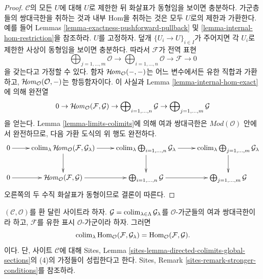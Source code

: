 \begin{proof}
$\mathcal{C}$의 모든 $U$에 대해 $U$로 제한한 뒤 화살표가 동형임을 보이면
충분하다. 가군층들의 쌍대극한을 취하는 것과 내부 Hom을 취하는 것은 모두
$U$로의 제한과 가환한다. 예를 들어 Lemmas
\ref{lemma-exactness-pushforward-pullback} 및
\ref{lemma-internal-hom-restriction}을 참조하라. $U$를 고정하자. 덮개
$\{U_i \to U\}_{i \in I}$가 주어지면 각 $U_i$로 제한한 사상이 동형임을
보이면 충분하다. 따라서 $\mathcal{F}$가 전역 표현
$$
\bigoplus\nolimits_{j = 1, \ldots, m}
\mathcal{O}
\longrightarrow
\bigoplus\nolimits_{i = 1, \ldots, n}
\mathcal{O}
\to
\mathcal{F}
\to
0
$$
을 갖는다고 가정할 수 있다. 함자 $\mathop{\mathcal{H}\!\mathit{om}}\nolimits_\mathcal{O}(-, -)$는 어느
변수에서든 유한 직합과 가환하고,
$\mathop{\mathcal{H}\!\mathit{om}}\nolimits_\mathcal{O}(\mathcal{O}, -)$는 항등함자이다. 이 사실과 Lemma
\ref{lemma-internal-hom-exact}에 의해 완전열
$$
0 \to
\mathop{\mathcal{H}\!\mathit{om}}\nolimits_\mathcal{O}(\mathcal{F}, \mathcal{G}) \to
\bigoplus\nolimits_{i = 1, \ldots, n} \mathcal{G} \to
\bigoplus\nolimits_{j = 1, \ldots, m} \mathcal{G}
$$
을 얻는다. Lemma \ref{lemma-limits-colimits}에 의해 여과 쌍대극한은
$\textit{Mod}(\mathcal{O})$ 안에서 완전하므로, 다음 가환 도식의 위 행도
완전하다.
$$
\xymatrix{
0 \ar[r] &
\colim_\lambda \SheafHom_\mathcal{O}(\mathcal{F}, \mathcal{G}_\lambda)
\ar[r] \ar[d] &
\colim_\lambda \bigoplus\nolimits_{i = 1, \ldots, n} \mathcal{G}_\lambda
\ar[r] \ar[d] &
\colim_\lambda \bigoplus\nolimits_{j = 1, \ldots, m} \mathcal{G}_\lambda
\ar[d] \\
0 \ar[r] &
\SheafHom_\mathcal{O}(\mathcal{F}, \mathcal{G}) \ar[r] &
\bigoplus\nolimits_{i = 1, \ldots, n} \mathcal{G} \ar[r] &
\bigoplus\nolimits_{j = 1, \ldots, m} \mathcal{G}
}
$$
오른쪽의 두 수직 화살표가 동형이므로 결론이 따른다.
\end{proof}

\begin{lemma}
\label{lemma-finite-presentation-quasi-compact-colimit}
$(\mathcal{C}, \mathcal{O})$를 환 달린 사이트라 하자.
$\mathcal{G} = \mathop{\mathrm{colim}}\nolimits_{\lambda \in \Lambda} \mathcal{G}_\lambda$를
$\mathcal{O}$-가군들의 여과 쌍대극한이라 하고, $\mathcal{F}$를 유한 표시
$\mathcal{O}$-가군이라 하자. 그러면
$$
\mathop{\mathrm{colim}}\nolimits_\lambda \mathop{\mathrm{Hom}}\nolimits_\mathcal{O}(\mathcal{F}, \mathcal{G}_\lambda)
=
\mathop{\mathrm{Hom}}\nolimits_\mathcal{O}(\mathcal{F}, \mathcal{G}).
$$
이다. 단, 사이트 $\mathcal{C}$에 대해 Sites, Lemma
\ref{sites-lemma-directed-colimits-global-sections}의 (4)의 가정들이
성립한다고 한다. Sites, Remark \ref{sites-remark-stronger-conditions}를
참조하라.
\end{lemma}

